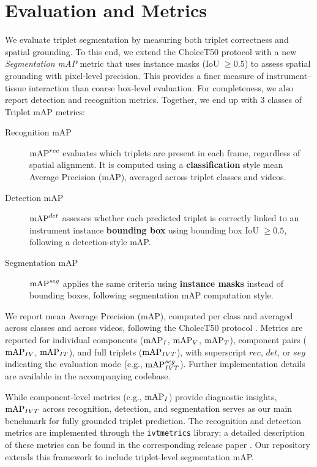 \section{Evaluation and Metrics}
\label{sec:evaluation}
We evaluate triplet segmentation by measuring both triplet correctness and spatial grounding. To this end, we extend the CholecT50 protocol \cite{NWOYE2022102433_rendevous} with a new \emph{Segmentation mAP} metric that uses instance masks (IoU $\geq 0.5$) to assess spatial grounding with pixel-level precision. 
This provides a finer measure of instrument–tissue interaction than coarse box-level evaluation. For completeness, we also report detection and recognition metrics.
Together, we end up with 3 classes of Triplet mAP metrics:
\begin{description}
\item[Recognition mAP] 
$\textrm{mAP}^{rec}$ evaluates which triplets are present in each frame, regardless of spatial alignment. 
It is computed using a \textbf{classification} style mean Average Precision (mAP), averaged across triplet classes and videos.  

\item[Detection mAP]
$\textrm{mAP}^{det}$ assesses whether each predicted triplet is correctly linked to an instrument instance \textbf{bounding box} using bounding box IoU $\geq 0.5$, following a detection-style mAP.  

\item[Segmentation mAP]
$\textrm{mAP}^{seg}$ applies the same criteria using \textbf{instance masks} instead of bounding boxes, following segmentation mAP computation style.
\end{description}

We report mean Average Precision (mAP), computed per class and averaged across classes and across videos, following the CholecT50 protocol \cite{NWOYE2022102433_rendevous}. Metrics are reported for individual components ($\textrm{mAP}_I$, $\textrm{mAP}_V$, $\textrm{mAP}_T$), component pairs ($\textrm{mAP}_{IV}$, $\textrm{mAP}_{IT}$), and full triplets ($\textrm{mAP}_{IVT}$), with superscript $rec$, $det$, or $seg$ indicating the evaluation mode (e.g., $\textrm{mAP}_{IVT}^{seg}$). Further implementation details are available in the accompanying codebase.


While component-level metrics (e.g., $\textrm{mAP}_{I}$) provide diagnostic insights, $\textrm{mAP}_{IVT}$ across recognition, detection, and segmentation serves as our main benchmark for fully grounded triplet prediction. The recognition and detection metrics are implemented through the \texttt{ivtmetrics} library; a detailed description of these metrics can be found in the corresponding release paper \cite{nwoye2023datasplitsmetricsmethod}. Our repository extends this framework to include triplet-level segmentation mAP.


